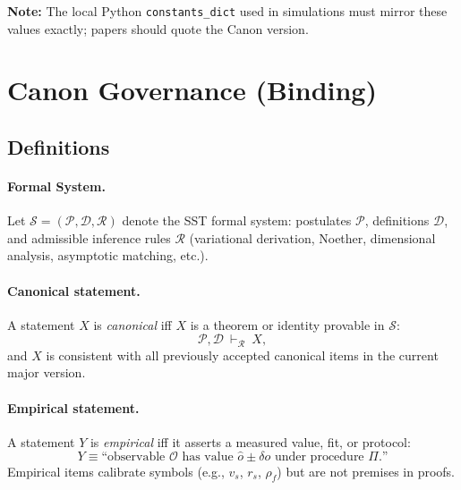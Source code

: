 \documentclass[11pt, a4paper]{article}
\newcommand{\vscore}{v_s}                                %
\newcommand{\rhof}{\rho_{\!f}}                           %
\newcommand{\rs}{r_s}                                    %
\begin{document}
    \textbf{Note:} The local Python \texttt{constants\_dict} used in simulations must mirror these values exactly; papers should quote the Canon version.


    \section*{Canon Governance (Binding)}

    \subsection*{Definitions}
    \paragraph{Formal System.}
    Let \(\mathcal{S} = (\mathcal{P},\mathcal{D},\mathcal{R})\) denote the SST formal system:
    postulates \(\mathcal{P}\), definitions \(\mathcal{D}\), and admissible inference rules \(\mathcal{R}\)
    (variational derivation, Noether, dimensional analysis, asymptotic matching, etc.).

    \paragraph{Canonical statement.}
    A statement \(X\) is \emph{canonical} iff \(X\) is a theorem or identity provable in \(\mathcal{S}\):
    \[
        \mathcal{P},\mathcal{D}\ \vdash_{\mathcal{R}}\ X,
    \]
    and \(X\) is consistent with all previously accepted canonical items in the current major version.

    \paragraph{Empirical statement.}
    A statement \(Y\) is \emph{empirical} iff it asserts a measured value, fit, or protocol:
    \[
        Y \equiv \text{“observable } \mathcal{O} \text{ has value } \hat{o} \pm \delta o \text{ under procedure } \Pi\text{.”}
    \]
    Empirical items calibrate symbols (e.g., $\vscore$, $\rs$, $\rhof$) but are not premises in proofs.
\end{document}

